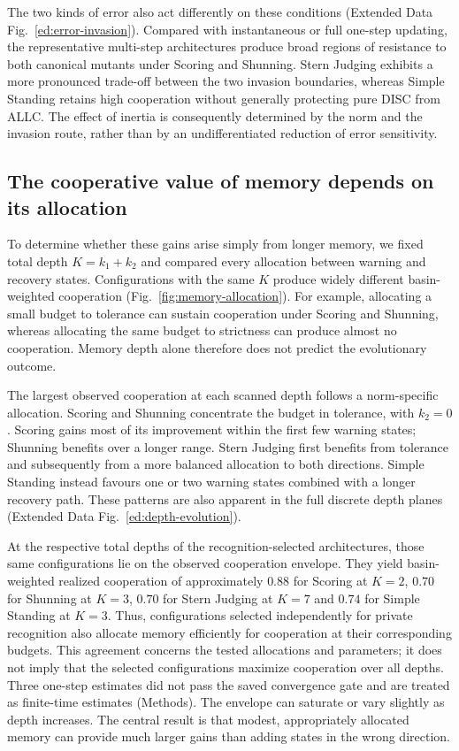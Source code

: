 \documentclass[fleqn,10pt]{article}
\begin{document}
The two kinds of error also act differently on these conditions (Extended Data Fig.~\ref{ed:error-invasion}). Compared with instantaneous or full one-step updating, the representative multi-step architectures produce broad regions of resistance to both canonical mutants under Scoring and Shunning. Stern Judging exhibits a more pronounced trade-off between the two invasion boundaries, whereas Simple Standing retains high cooperation without generally protecting pure DISC from ALLC. The effect of inertia is consequently determined by the norm and the invasion route, rather than by an undifferentiated reduction of error sensitivity.

\subsection*{The cooperative value of memory depends on its allocation}

To determine whether these gains arise simply from longer memory, we fixed total depth $K=k_1+k_2$ and compared every allocation between warning and recovery states. Configurations with the same $K$ produce widely different basin-weighted cooperation (Fig.~\ref{fig:memory-allocation}). For example, allocating a small budget to tolerance can sustain cooperation under Scoring and Shunning, whereas allocating the same budget to strictness can produce almost no cooperation. Memory depth alone therefore does not predict the evolutionary outcome.

The largest observed cooperation at each scanned depth follows a norm-specific allocation. Scoring and Shunning concentrate the budget in tolerance, with $k_2=0$. Scoring gains most of its improvement within the first few warning states; Shunning benefits over a longer range. Stern Judging first benefits from tolerance and subsequently from a more balanced allocation to both directions. Simple Standing instead favours one or two warning states combined with a longer recovery path. These patterns are also apparent in the full discrete depth planes (Extended Data Fig.~\ref{ed:depth-evolution}).

At the respective total depths of the recognition-selected architectures, those same configurations lie on the observed cooperation envelope. They yield basin-weighted realized cooperation of approximately $0.88$ for Scoring at $K=2$, $0.70$ for Shunning at $K=3$, $0.70$ for Stern Judging at $K=7$ and $0.74$ for Simple Standing at $K=3$. Thus, configurations selected independently for private recognition also allocate memory efficiently for cooperation at their corresponding budgets. This agreement concerns the tested allocations and parameters; it does not imply that the selected configurations maximize cooperation over all depths. Three one-step estimates did not pass the saved convergence gate and are treated as finite-time estimates (Methods). The envelope can saturate or vary slightly as depth increases. The central result is that modest, appropriately allocated memory can provide much larger gains than adding states in the wrong direction.
\end{document}
